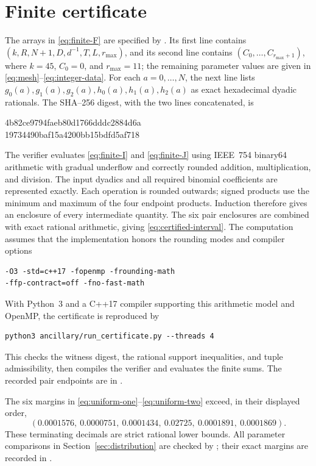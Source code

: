 \documentclass[11pt,reqno]{amsart}
\theoremstyle{definition}
\theoremstyle{remark}
\numberwithin{equation}{section}
\begin{document}
\appendix
\section{Finite certificate}\label{app:certificate}\label{app:margins}
The arrays in \eqref{eq:finite-F} are specified by
. Its first line contains
$(k,R,N+1,D,d^{-1},T,L,r_{\max})$, and its second line contains
$(C_0,\ldots,C_{r_{\max}+1})$, where $k=45$, $C_0=0$, and $r_{\max}=11$;
the remaining parameter values are given in
\eqref{eq:mesh}--\eqref{eq:integer-data}.
For each $a=0,\ldots,N$, the next line lists
$g_0(a),g_1(a),g_2(a),h_0(a),h_1(a),h_2(a)$ as exact hexadecimal
dyadic rationals. The SHA--256 digest, with the two lines concatenated, is
\begin{center}
\small\ttfamily
4b82ce9794faeb80d1766dddc2884d6a\\
19734490baf15a4200bb15bdfd5af718
\end{center}

The verifier  evaluates
\eqref{eq:finite-I} and \eqref{eq:finite-J} using IEEE~754 binary64
arithmetic with gradual underflow and correctly rounded addition,
multiplication, and division. The input dyadics and all required binomial
coefficients are represented exactly. Each operation is rounded outwards;
signed products use the minimum and maximum of the four endpoint
products. Induction therefore gives an enclosure of every intermediate
quantity. The six pair enclosures are combined with exact rational
arithmetic, giving \eqref{eq:certified-interval}. The computation assumes
that the implementation honors the rounding modes and compiler options
\begin{verbatim}
-O3 -std=c++17 -fopenmp -frounding-math
-ffp-contract=off -fno-fast-math
\end{verbatim}

With Python~3 and a C++17 compiler supporting this arithmetic model and
OpenMP, the certificate is reproduced by
\begin{verbatim}
python3 ancillary/run_certificate.py --threads 4
\end{verbatim}
This checks the witness digest, the rational support inequalities, and
tuple admissibility, then compiles the verifier and evaluates the finite
sums. The recorded pair endpoints are in
.

The six margins in \eqref{eq:uniform-one}--\eqref{eq:uniform-two}
exceed, in their displayed order,
\[
 (0.0001576,\ 0.0000751,\ 0.0001434,\ 0.02725,\ 0.0001891,\ 0.0001869).
\]
These terminating decimals are strict rational lower bounds. All
parameter comparisons in Section~\ref{sec:distribution} are checked by
; their exact margins are recorded in
.
\end{document}
